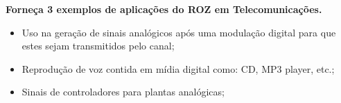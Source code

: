 \textbf{Forneça 3 exemplos de aplicações do ROZ em Telecomunicações.}

\begin{itemize}
    \item Uso na geração de sinais analógicos após uma modulação digital para que estes sejam transmitidos pelo canal;
    \item Reprodução de voz contida em mídia digital como: CD, MP3 player, etc.;
    \item Sinais de controladores para plantas analógicas;
\end{itemize}